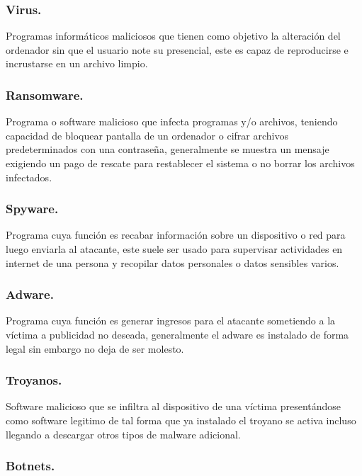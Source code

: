 \documentclass[10pt]{article}
\begin{document}
\subsubsection{Virus.}

Programas informáticos maliciosos que tienen como objetivo la alteración del ordenador sin que el usuario note su presencial, este es capaz de reproducirse e incrustarse en un archivo limpio. \cite{6} 

\subsubsection{Ransomware.}

Programa o software malicioso que infecta programas y/o archivos, teniendo capacidad de bloquear pantalla de un ordenador o cifrar archivos predeterminados con una contraseña, generalmente se muestra un mensaje exigiendo un pago de rescate para restablecer el sistema o no borrar los archivos infectados. \cite{5}

\subsubsection{Spyware.}

Programa cuya función es recabar información sobre un dispositivo o red para luego enviarla al atacante, este suele ser usado para supervisar actividades en internet de una persona y recopilar datos personales o datos sensibles varios. \cite{5}

\subsubsection{Adware.}

Programa cuya función es generar ingresos para el atacante sometiendo a la víctima a publicidad no deseada, generalmente el adware es instalado de forma legal sin embargo no deja de ser molesto. \cite{5}

\subsubsection{Troyanos.}

Software malicioso que se infiltra al dispositivo de una víctima presentándose como software legitimo de tal forma que ya instalado el troyano se activa incluso llegando a descargar otros tipos de malware adicional. \cite{5}

\subsubsection{Botnets.}
\end{document}
